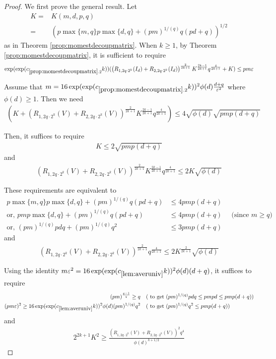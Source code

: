 \documentclass[11pt]{amsart}
\numberwithin{equation}{section}
\numberwithin{equation}{section}
\begin{document}
\begin{proof}


We first prove the general result. Let
\begin{align*}
    K=&K(m,d,p,q)\\=&\left(p\max\{m,q\}p\max\{d,q\}+(pm)^{1/(q)}q(pd+q) \right)^{1/2}
\end{align*}
as in Theorem \ref{prop:momestdecoupmatrix}.
When $k \ge 1$, by Theorem \ref{prop:momestdecoupmatrix}, it is sufficient to require \begin{align*}
\exp(\exp(c_{\ref{prop:momestdecoupmatrix}.2}k))(\left(R_{1,2q \cdot 2^k}(I_d)+R_{2,2q \cdot 2^k}(I_d)\right)^{\frac{2}{2k+1}}K^{\frac{2k-1}{2k+1}} q^{\frac{4}{2k+1}}+K) \le pm \varepsilon
\end{align*}

Assume that $m=16\exp(\exp(c_{\ref{prop:momestdecoupmatrix}.2}k))^2\phi(d)\frac{d+q}{\varepsilon^2}$ where $\phi(d) \ge 1$. Then we need
\begin{align*}
\left(K+\left(R_{1,2q \cdot 2^k}(V)+R_{2,2q \cdot 2^k}(V)\right)^{\frac{2}{2k+1}}K^{\frac{2k-1}{2k+1}} q^{\frac{4}{2k+1}}\right) \le 4\sqrt{\phi(d)}\sqrt{pmp(d+q)}
\end{align*}


Then, it suffices to require
\begin{align*}
    K \le 2\sqrt{pmp(d+q)}
\end{align*}
and
\begin{align*}
    \left(R_{1,2q \cdot 2^k}(V)+R_{2,2q \cdot 2^k}(V)\right)^{\frac{2}{2k+1}}K^{\frac{2k-1}{2k+1}} q^{\frac{4}{2k+1}}\le 2K \sqrt{\phi(d)}
\end{align*}

These requirements are equivalent to
\begin{align*}
    p\max\{m,q\}p\max\{d,q\}+(pm)^{1/(q)}q(pd+q)  &\le 4pmp(d+q) \\
    \text{or, } pmp\max\{d,q\}+(pm)^{1/(q)}q(pd+q)  &\le 4pmp(d+q) \quad \text{ (since $m \ge q$)} \\
    \text{or, } (pm)^{1/(q)}pdq + (pm)^{1/(q)}q^2  &\le 3pmp(d+q) 
\end{align*}
and
\begin{align*}
    \left(R_{1,2q \cdot 2^k}(V)+R_{2,2q \cdot 2^k}(V)\right)^{\frac{2}{2k+1}} q^{\frac{4}{2k+1}}\le 2K^{\frac{2}{2k+1}}\sqrt{\phi(d)}
\end{align*}

Using the identity $m\varepsilon^2=16\exp(\exp(c_{\ref{lem:averuniv}}k))^2\phi(d){(d+q)}$, it suffices to require
\begin{align*}
    (pm)^{\frac{q-1}{q}} \ge q &\quad \text{( to get }  (pm)^{1/(q)}pdq \le pmpd \le pmp(d+q) \text{)}\\
    (pm\varepsilon)^2 \ge 16\exp(\exp(c_{\ref{lem:averuniv}}k))^2\phi(d)(pm)^{1/(q)}q^2 &\quad \text{( to get } (pm)^{1/(q)}q^2 \le pmp(d+q) \text{)}
\end{align*}
and
\begin{align*}
    2^{2k+1}K^2 \ge \frac{\left(R_{1,2q \cdot 2^k}(V)+R_{2,2q \cdot 2^k}(V)\right)^2 q^{4}}{\phi(d)^{k+1/2}}
\end{align*}


\end{proof}
\end{document}
